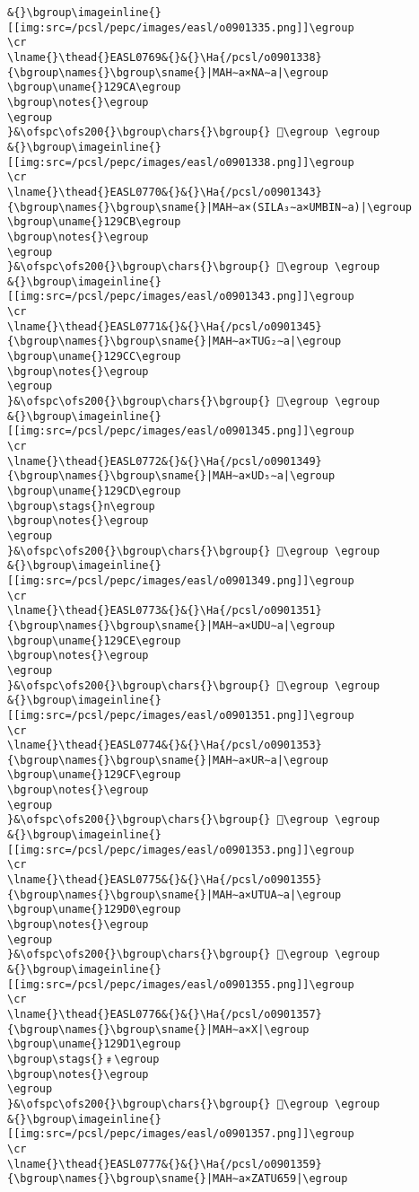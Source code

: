 \begin{verbatim}
&{}\bgroup\imageinline{}[[img:src=/pcsl/pepc/images/easl/o0901335.png]]\egroup
\cr
\lname{}\thead{}EASL0769&{}&{}\Ha{/pcsl/o0901338}{\bgroup\names{}\bgroup\sname{}|MAH∼a×NA∼a|\egroup
\bgroup\uname{}129CA\egroup
\bgroup\notes{}\egroup
\egroup
}&\ofspc\ofs200{}\bgroup\chars{}\bgroup{} 𒧊\egroup \egroup
&{}\bgroup\imageinline{}[[img:src=/pcsl/pepc/images/easl/o0901338.png]]\egroup
\cr
\lname{}\thead{}EASL0770&{}&{}\Ha{/pcsl/o0901343}{\bgroup\names{}\bgroup\sname{}|MAH∼a×(SILA₃∼a×UMBIN∼a)|\egroup
\bgroup\uname{}129CB\egroup
\bgroup\notes{}\egroup
\egroup
}&\ofspc\ofs200{}\bgroup\chars{}\bgroup{} 𒧋\egroup \egroup
&{}\bgroup\imageinline{}[[img:src=/pcsl/pepc/images/easl/o0901343.png]]\egroup
\cr
\lname{}\thead{}EASL0771&{}&{}\Ha{/pcsl/o0901345}{\bgroup\names{}\bgroup\sname{}|MAH∼a×TUG₂∼a|\egroup
\bgroup\uname{}129CC\egroup
\bgroup\notes{}\egroup
\egroup
}&\ofspc\ofs200{}\bgroup\chars{}\bgroup{} 𒧌\egroup \egroup
&{}\bgroup\imageinline{}[[img:src=/pcsl/pepc/images/easl/o0901345.png]]\egroup
\cr
\lname{}\thead{}EASL0772&{}&{}\Ha{/pcsl/o0901349}{\bgroup\names{}\bgroup\sname{}|MAH∼a×UD₅∼a|\egroup
\bgroup\uname{}129CD\egroup
\bgroup\stags{}n\egroup
\bgroup\notes{}\egroup
\egroup
}&\ofspc\ofs200{}\bgroup\chars{}\bgroup{} 𒧍\egroup \egroup
&{}\bgroup\imageinline{}[[img:src=/pcsl/pepc/images/easl/o0901349.png]]\egroup
\cr
\lname{}\thead{}EASL0773&{}&{}\Ha{/pcsl/o0901351}{\bgroup\names{}\bgroup\sname{}|MAH∼a×UDU∼a|\egroup
\bgroup\uname{}129CE\egroup
\bgroup\notes{}\egroup
\egroup
}&\ofspc\ofs200{}\bgroup\chars{}\bgroup{} 𒧎\egroup \egroup
&{}\bgroup\imageinline{}[[img:src=/pcsl/pepc/images/easl/o0901351.png]]\egroup
\cr
\lname{}\thead{}EASL0774&{}&{}\Ha{/pcsl/o0901353}{\bgroup\names{}\bgroup\sname{}|MAH∼a×UR∼a|\egroup
\bgroup\uname{}129CF\egroup
\bgroup\notes{}\egroup
\egroup
}&\ofspc\ofs200{}\bgroup\chars{}\bgroup{} 𒧏\egroup \egroup
&{}\bgroup\imageinline{}[[img:src=/pcsl/pepc/images/easl/o0901353.png]]\egroup
\cr
\lname{}\thead{}EASL0775&{}&{}\Ha{/pcsl/o0901355}{\bgroup\names{}\bgroup\sname{}|MAH∼a×UTUA∼a|\egroup
\bgroup\uname{}129D0\egroup
\bgroup\notes{}\egroup
\egroup
}&\ofspc\ofs200{}\bgroup\chars{}\bgroup{} 𒧐\egroup \egroup
&{}\bgroup\imageinline{}[[img:src=/pcsl/pepc/images/easl/o0901355.png]]\egroup
\cr
\lname{}\thead{}EASL0776&{}&{}\Ha{/pcsl/o0901357}{\bgroup\names{}\bgroup\sname{}|MAH∼a×X|\egroup
\bgroup\uname{}129D1\egroup
\bgroup\stags{}﹟\egroup
\bgroup\notes{}\egroup
\egroup
}&\ofspc\ofs200{}\bgroup\chars{}\bgroup{} 𒧑\egroup \egroup
&{}\bgroup\imageinline{}[[img:src=/pcsl/pepc/images/easl/o0901357.png]]\egroup
\cr
\lname{}\thead{}EASL0777&{}&{}\Ha{/pcsl/o0901359}{\bgroup\names{}\bgroup\sname{}|MAH∼a×ZATU659|\egroup

\end{verbatim}
